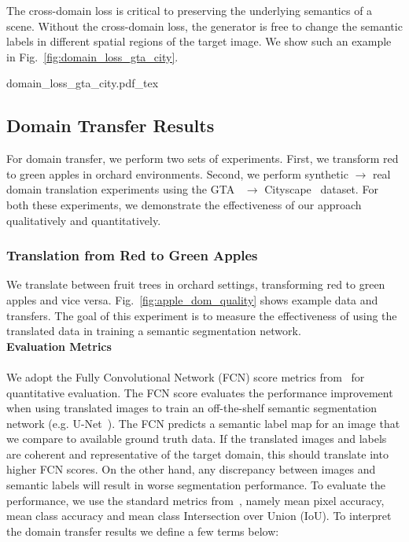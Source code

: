 The cross-domain loss is critical to preserving the underlying semantics of a scene. Without the cross-domain loss, the generator is free to change the semantic labels in different spatial regions of the target image. We show such an example in Fig.~\ref{fig:domain_loss_gta_city}.
\begin{figure*}[!hbpt]
    \centering
    \def\svgwidth{\textwidth}
        {domain_loss_gta_city.pdf_tex}
    \caption[Qualitative analysis of the effects of cross-domain loss.]{Qualitative analysis of the effects of the proposed cross-domain loss. In the absence of the cross-domain loss, the generator is free to change the semantic labels in different spatial regions of the target image (middle row). With the addition of cross-domain loss such anomalies can be prevented (last row).}
    \label{fig:domain_loss_gta_city}
\end{figure*}

\subsection{Domain Transfer Results}
For domain transfer, we perform two sets of experiments. First, we transform red to green apples in orchard environments. Second, we perform synthetic $\to$ real domain translation experiments using the GTA~\cite{richter_playing_2016} $\to$ Cityscape~\cite{cordts_cityscapes_2016} dataset. For both these experiments, we demonstrate the effectiveness of our approach qualitatively and quantitatively.

\subsubsection{Translation from Red to Green Apples}
We translate between fruit trees in orchard settings, transforming red to green apples and vice versa. Fig.~\ref{fig:apple_dom_quality} shows example data and transfers. The goal of this experiment is to measure the effectiveness of using the translated data in training a semantic segmentation network.\\ 

\noindent\textbf{Evaluation Metrics}\\\\
We adopt the Fully Convolutional Network (FCN) score metrics from~\cite{cordts_cityscapes_2016} for quantitative evaluation. The FCN score evaluates the performance improvement when using translated images to train an off-the-shelf semantic segmentation network (e.g. U-Net~\cite{ronneberger_u-net:_2015}). The FCN predicts a semantic label map for an image that we compare to available ground truth data. If the translated images and labels are coherent and representative of the target domain, this should translate into higher FCN scores. On the other hand, any discrepancy between images and semantic labels will result in worse segmentation performance. To evaluate the performance, we use the standard metrics from~\cite{cordts_cityscapes_2016}, namely mean pixel accuracy, mean class accuracy and mean class Intersection over Union (IoU). To interpret the domain transfer results we define a few terms below:\\\\

